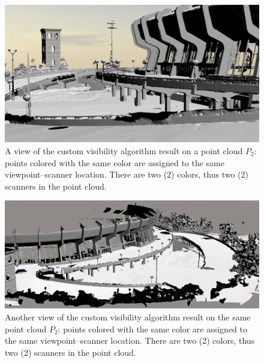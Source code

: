 \begin{figure}[h]
  \centering
  \includegraphics[scale=0.35]{img/complete-result1.png}
  \caption{A view of the custom visibility algorithm result on a point cloud $P_2$: points colored with the same color are assigned to the same viewpoint--scanner location. There are two (2) colors, thus two (2) scanners in the point cloud.}
  \label{fig:complete-result1}
\end{figure}
\begin{figure}[h]
  \centering
  \includegraphics[scale=0.35]{img/complete-result2.png}
  \caption{Another view of the custom visibility algorithm result on the same point cloud $P_2$: points colored with the same color are assigned to the same viewpoint--scanner location. There are two (2) colors, thus two (2) scanners in the point cloud.}
  \label{fig:complete-result2}
\end{figure}

